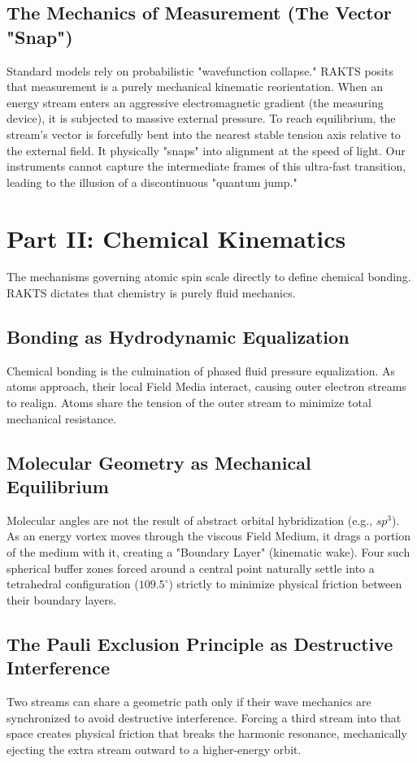 \documentclass[reprint,amsmath,amssymb,aps,prd,twocolumn]{revtex4-2}
\begin{document}
\subsection{The Mechanics of Measurement (The Vector "Snap")}
Standard models rely on probabilistic "wavefunction collapse." RAKTS posits that measurement is a purely mechanical kinematic reorientation. When an energy stream enters an aggressive electromagnetic gradient (the measuring device), it is subjected to massive external pressure. To reach equilibrium, the stream's vector is forcefully bent into the nearest stable tension axis relative to the external field. It physically "snaps" into alignment at the speed of light. Our instruments cannot capture the intermediate frames of this ultra-fast transition, leading to the illusion of a discontinuous "quantum jump."

\section{Part II: Chemical Kinematics}

The mechanisms governing atomic spin scale directly to define chemical bonding. RAKTS dictates that chemistry is purely fluid mechanics.

\subsection{Bonding as Hydrodynamic Equalization}
Chemical bonding is the culmination of phased fluid pressure equalization. As atoms approach, their local Field Media interact, causing outer electron streams to realign. Atoms share the tension of the outer stream to minimize total mechanical resistance.

\subsection{Molecular Geometry as Mechanical Equilibrium}
Molecular angles are not the result of abstract orbital hybridization (e.g., $sp^3$). As an energy vortex moves through the viscous Field Medium, it drags a portion of the medium with it, creating a "Boundary Layer" (kinematic wake). Four such spherical buffer zones forced around a central point naturally settle into a tetrahedral configuration ($109.5^\circ$) strictly to minimize physical friction between their boundary layers.

\subsection{The Pauli Exclusion Principle as Destructive Interference}
Two streams can share a geometric path only if their wave mechanics are synchronized to avoid destructive interference. Forcing a third stream into that space creates physical friction that breaks the harmonic resonance, mechanically ejecting the extra stream outward to a higher-energy orbit.
\end{document}

